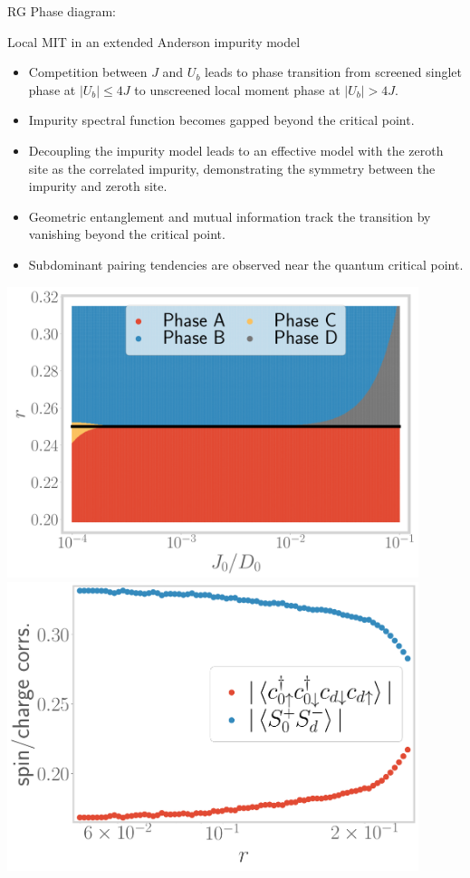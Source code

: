 \documentclass[8pt,aspectratio=169]{beamer}
\newcommand{\nitem}{\item[\ding{51}]}
\begin{document}
\begin{frame}{RG Phase diagram: }
\end{frame}

\begin{frame}{Local MIT in an extended Anderson impurity model}
\hspace*{-40pt}
\begin{minipage}{0.65\textwidth}
\begin{itemize}
\nitem Competition between $J$ and $U_b$ leads to phase transition from screened singlet phase at \(|U_b| \leq 4J\) to unscreened local moment phase at \(|U_b| > 4J\).
\nitem Impurity spectral function becomes gapped beyond the critical point.
\nitem Decoupling the impurity model leads to an effective model with the zeroth site as the correlated impurity, demonstrating the symmetry between the impurity and zeroth site.
\nitem Geometric entanglement and mutual information track the transition by vanishing beyond the critical point.
\nitem Subdominant pairing tendencies are observed near the quantum critical point.
\end{itemize}
\end{minipage}
\hspace*{5pt}
\begin{minipage}{0.41\textwidth}
\includegraphics[width=0.9\textwidth]{phase-map-MIT.pdf}
\includegraphics[width=0.9\textwidth]{odlro_d0.pdf}
\end{minipage}
\hspace*{-40pt}
\end{frame}
\end{document}

